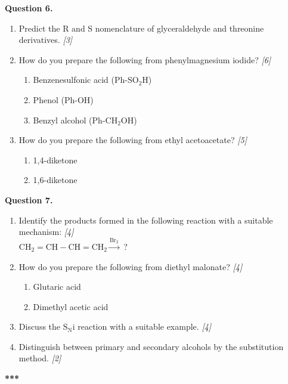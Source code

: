 \documentclass[11pt,a4paper]{article}
\newcommand{\pts}[1]{\hfill \textit{[#1]}}
\begin{document}
\bigskip

\noindent \textbf{Question 6.}
\begin{enumerate}[label=(\alph*)]
  \item Predict the R and S nomenclature of glyceraldehyde and threonine derivatives. \pts{3}
  \item How do you prepare the following from phenylmagnesium iodide? \pts{6}
  \begin{enumerate}[label=(\roman*)]
    \item Benzenesulfonic acid ($\text{Ph-SO}_2\text{H}$)
    \item Phenol ($\text{Ph-OH}$)
    \item Benzyl alcohol ($\text{Ph-CH}_2\text{OH}$)
  \end{enumerate}
  \item How do you prepare the following from ethyl acetoacetate? \pts{5}
  \begin{enumerate}[label=(\roman*)]
    \item 1,4-diketone
    \item 1,6-diketone
  \end{enumerate}
\end{enumerate}

\bigskip

\noindent \textbf{Question 7.}
\begin{enumerate}[label=(\alph*)]
  \item Identify the products formed in the following reaction with a suitable mechanism: \pts{4}\\
  $\text{CH}_2=\text{CH}-\text{CH}=\text{CH}_2 \xrightarrow{\text{Br}_2}$ ?
  \item How do you prepare the following from diethyl malonate? \pts{4}
  \begin{enumerate}[label=(\roman*)]
    \item Glutaric acid
    \item Dimethyl acetic acid
  \end{enumerate}
  \item Discuss the $\text{S}_\text{N}\text{i}$ reaction with a suitable example. \pts{4}
  \item Distinguish between primary and secondary alcohols by the substitution method. \pts{2}
\end{enumerate}

\bigskip
\begin{center}
  \textbf{***}
\end{center}
\end{document}
